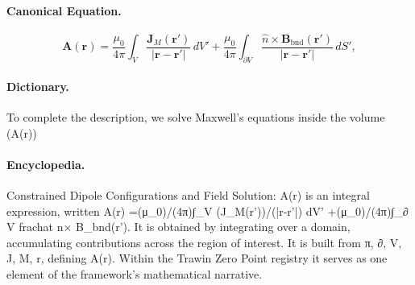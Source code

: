 \paragraph{Canonical Equation.}
\[
\mathbf{A}(\mathbf{r}) =\frac{\mu_0}{4\pi}\int_V \frac{\mathbf{J}_M(\mathbf{r}')}{|\mathbf{r}-\mathbf{r}'|}\,dV' +\frac{\mu_0}{4\pi}\int_{\partial V} \frac{\hat n\times \mathbf{B}_{\mathrm{bnd}}(\mathbf{r}')}{|\mathbf{r}-\mathbf{r}'|}\,dS',
\]

\paragraph{Dictionary.}
To complete the description, we solve Maxwell's equations inside the volume (A(r))

\paragraph{Encyclopedia.}
Constrained Dipole Configurations and Field Solution: A(r) is an integral expression, written A(r) =(μ\_0)/(4π)∫\_V (J\_M(r'))/(|r-r'|) dV' +(μ\_0)/(4π)∫\_∂ V frachat n× B\_bnd(r'). It is obtained by integrating over a domain, accumulating contributions across the region of interest. It is built from π, ∂, V, J, M, r, defining A(r). Within the Trawin Zero Point registry it serves as one element of the framework's mathematical narrative.
